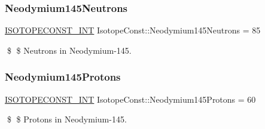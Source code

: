 \subsubsection{\texorpdfstring{Neodymium145\+Neutrons}{Neodymium145Neutrons}}
{\footnotesize\ttfamily \mbox{\hyperlink{group___isotope_const-_macros_ga5f18360b3e99483a35c32d789e62621c}{I\+S\+O\+T\+O\+P\+E\+C\+O\+N\+S\+T\+\_\+\+I\+NT}} Isotope\+Const\+::\+Neodymium145\+Neutrons = 85}

\$ \$ Neutrons in Neodymium-\/145. \mbox{\label{group___isotope_const-_neodymium-_nd145_gab250a277978af74e1ab415060c4a15f7}} 
\subsubsection{\texorpdfstring{Neodymium145\+Protons}{Neodymium145Protons}}
{\footnotesize\ttfamily \mbox{\hyperlink{group___isotope_const-_macros_ga5f18360b3e99483a35c32d789e62621c}{I\+S\+O\+T\+O\+P\+E\+C\+O\+N\+S\+T\+\_\+\+I\+NT}} Isotope\+Const\+::\+Neodymium145\+Protons = 60}

\$ \$ Protons in Neodymium-\/145. 